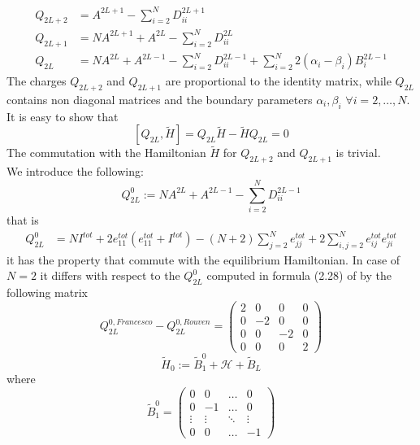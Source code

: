 \documentclass[11pt]{article}
\numberwithin{equation}{section}
\numberwithin{equation}{subsection}
\begin{document}
\begin{align}
	Q_{2L+2}&=A^{2L+1}-\sum_{i=2}^{N}D_{ii}^{2L+1}\\
	Q_{2L+1}&=NA^{2L+1}+A^{2L}-\sum_{i=2}^{N}D_{ii}^{2L}\\
	Q_{2L\phantom{+}}&=NA^{2L}+A^{2L-1}-\sum_{i=2}^{N}D_{ii}^{2L-1}+\sum_{i=2}^{N}2(\alpha_{i}-\beta_{i})B_{i}^{2L-1}
\end{align}
The charges $Q_{2L+2}$ and $Q_{2L+1}$ are proportional to the identity matrix, while $Q_{2L}$ contains non diagonal matrices and the boundary parameters $\alpha_{i},\beta_{i}$ $\forall i=2,\ldots,N$.\\
It is easy to show that 
\begin{equation}
	\left[Q_{2L},\widetilde{H}\right]=Q_{2L}\widetilde{H}-\widetilde{H}Q_{2L}=0
\end{equation}
The commutation with the Hamiltonian $\widetilde{H}$ for $Q_{2L+2}$ and $Q_{2L+1}$ is trivial. \\
We introduce the following:
\begin{equation}
Q_{2L}^{0}:=NA^{2L}+A^{2L-1}-\sum_{i=2}^{N}D_{ii}^{2L-1}
\end{equation}
that is 
\begin{equation}
\begin{split}
Q_{2L}^{0}&=NI^{tot}+2e_{11}^{tot}(e_{11}^{tot}+I^{tot})-(N+2)\sum_{j=2}^{N}e_{jj}^{tot}+2\sum_{i,j=2}^{N}e_{ij}^{tot}e_{ji}^{tot}
\end{split}
\end{equation}
it has the property that commute with the equilibrium Hamiltonian. In case of $N=2$ it differs with respect to the $Q_{2L}^{0}$ computed in formula (2.28) of \cite{frassek2020eigenstates} by the following matrix 
\begin{equation}
Q_{2L}^{0,Francesco}-Q_{2L}^{0,Rouven}=	\begin{pmatrix}
		2&0&0&0\\
		0&-2&0&0\\
		0&0&-2&0\\
		0&0&0&2
	\end{pmatrix}
\end{equation}
\begin{equation}
\widetilde{H}_{0}:=\widetilde{B}_{1}^{0}+\mathcal{H}+\widetilde{B}_{L}
\end{equation}
where 
\begin{equation}
\widetilde{B}_{1}^{0}=\begin{pmatrix}
0&0&\ldots&0\\
0&-1&\ldots&0\\
\vdots&\vdots&\ddots&\vdots\\
0&0&\ldots&-1
\end{pmatrix}
\end{equation}
\end{document}
